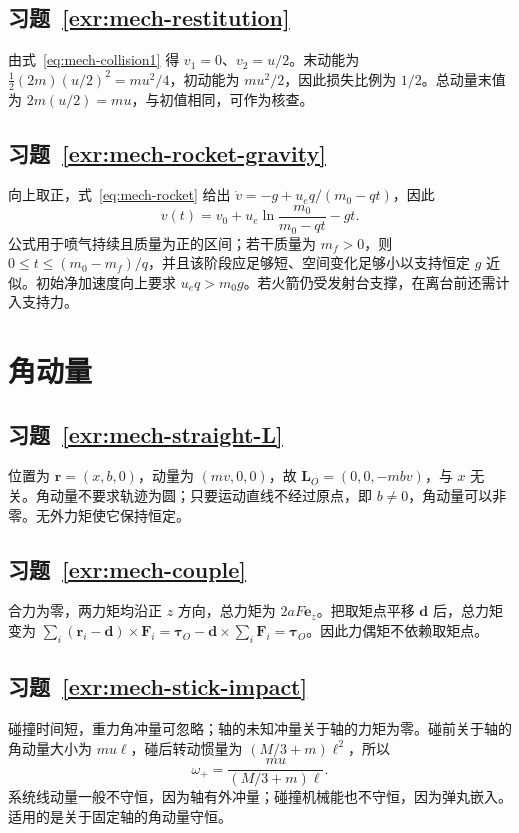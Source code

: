 \documentclass[UTF8,12pt,a4paper,fontset=fandol]{ctexbook}
\begin{document}
\subsection*{习题~\ref{exr:mech-restitution}}
由式~\eqref{eq:mech-collision1} 得 $v_1=0$、$v_2=u/2$。末动能为 $\tfrac12(2m)(u/2)^2=mu^2/4$，初动能为 $mu^2/2$，因此损失比例为 $1/2$。总动量末值为 $2m(u/2)=mu$，与初值相同，可作为核查。

\subsection*{习题~\ref{exr:mech-rocket-gravity}}
向上取正，式~\eqref{eq:mech-rocket} 给出 $\dot v=-g+u_eq/(m_0-qt)$，因此
\[
 v(t)=v_0+u_e\ln\frac{m_0}{m_0-qt}-gt.
\]
公式用于喷气持续且质量为正的区间；若干质量为 $m_f>0$，则 $0\le t\le(m_0-m_f)/q$，并且该阶段应足够短、空间变化足够小以支持恒定 $g$ 近似。初始净加速度向上要求 $u_eq>m_0g$。若火箭仍受发射台支撑，在离台前还需计入支持力。

\section{角动量}
\subsection*{习题~\ref{exr:mech-straight-L}}
位置为 $\mathbf r=(x,b,0)$，动量为 $(mv,0,0)$，故 $\mathbf L_O=(0,0,-mbv)$，与 $x$ 无关。角动量不要求轨迹为圆；只要运动直线不经过原点，即 $b\ne0$，角动量可以非零。无外力矩使它保持恒定。

\subsection*{习题~\ref{exr:mech-couple}}
合力为零，两力矩均沿正 $z$ 方向，总力矩为 $2aF\mathbf e_z$。把取矩点平移 $\mathbf d$ 后，总力矩变为 $\sum_i(\mathbf r_i-\mathbf d)\times\mathbf F_i=\boldsymbol\tau_O-\mathbf d\times\sum_i\mathbf F_i=\boldsymbol\tau_O$。因此力偶矩不依赖取矩点。

\subsection*{习题~\ref{exr:mech-stick-impact}}
碰撞时间短，重力角冲量可忽略；轴的未知冲量关于轴的力矩为零。碰前关于轴的角动量大小为 $mu\ell$，碰后转动惯量为 $(M/3+m)\ell^2$，所以
\[
 \omega_+=\frac{mu}{(M/3+m)\ell}.
\]
系统线动量一般不守恒，因为轴有外冲量；碰撞机械能也不守恒，因为弹丸嵌入。适用的是关于固定轴的角动量守恒。
\end{document}
